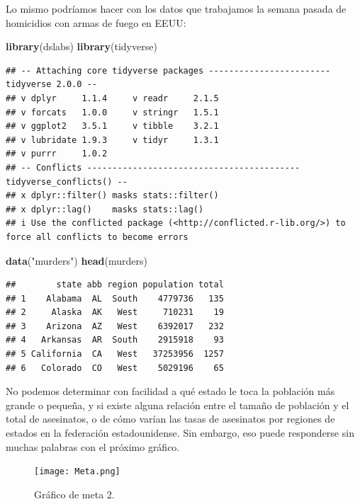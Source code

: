 \documentclass[
]{article}
\newenvironment{Shaded}{\begin{snugshade}}{\end{snugshade}}
\newcommand{\FunctionTok}[1]{\textcolor[rgb]{0.13,0.29,0.53}{\textbf{#1}}}
\newcommand{\NormalTok}[1]{#1}
\newcommand{\StringTok}[1]{\textcolor[rgb]{0.31,0.60,0.02}{#1}}
\begin{document}
Lo mismo podríamos hacer con los datos que trabajamos la semana pasada
de homicidios con armas de fuego en EEUU:

\begin{Shaded}
\begin{Highlighting}[]
\FunctionTok{library}\NormalTok{(dslabs)}
\FunctionTok{library}\NormalTok{(tidyverse)}
\end{Highlighting}
\end{Shaded}

\begin{verbatim}
## -- Attaching core tidyverse packages ------------------------ tidyverse 2.0.0 --
## v dplyr     1.1.4     v readr     2.1.5
## v forcats   1.0.0     v stringr   1.5.1
## v ggplot2   3.5.1     v tibble    3.2.1
## v lubridate 1.9.3     v tidyr     1.3.1
## v purrr     1.0.2     
## -- Conflicts ------------------------------------------ tidyverse_conflicts() --
## x dplyr::filter() masks stats::filter()
## x dplyr::lag()    masks stats::lag()
## i Use the conflicted package (<http://conflicted.r-lib.org/>) to force all conflicts to become errors
\end{verbatim}

\begin{Shaded}
\begin{Highlighting}[]
\FunctionTok{data}\NormalTok{(}\StringTok{"murders"}\NormalTok{)}
\FunctionTok{head}\NormalTok{(murders)}
\end{Highlighting}
\end{Shaded}

\begin{verbatim}
##        state abb region population total
## 1    Alabama  AL  South    4779736   135
## 2     Alaska  AK   West     710231    19
## 3    Arizona  AZ   West    6392017   232
## 4   Arkansas  AR  South    2915918    93
## 5 California  CA   West   37253956  1257
## 6   Colorado  CO   West    5029196    65
\end{verbatim}

No podemos determinar con facilidad a qué estado le toca la población
más grande o pequeña, y si existe alguna relación entre el tamaño de
población y el total de asesinatos, o de cómo varían las tasas de
asesinatos por regiones de estados en la federación estadounidense. Sin
embargo, eso puede responderse sin muchas palabras con el próximo
gráfico.

\begin{figure}
\centering
\texttt{[image: Meta.png]}
\caption{Gráfico de meta 2.}
\end{figure}
\end{document}
